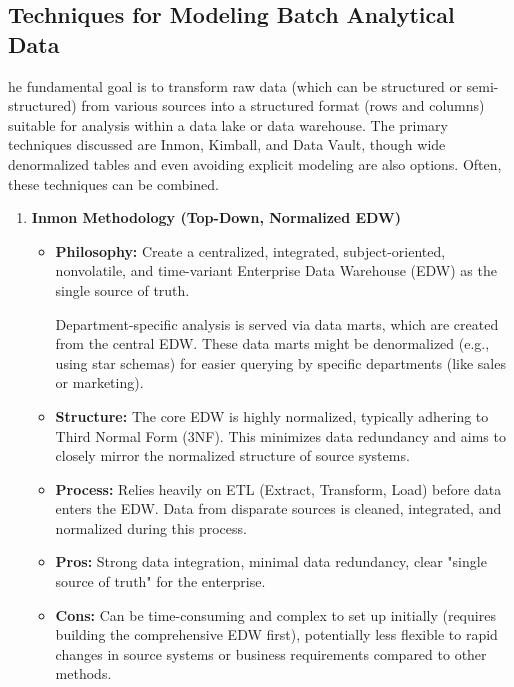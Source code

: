 \subsection*{Techniques for Modeling Batch Analytical Data}
he fundamental goal is to transform raw data (which can be structured or
semi-structured) from various sources into a structured format (rows and
columns) suitable for analysis within a data lake or data warehouse.
The primary techniques discussed are Inmon, Kimball, and Data Vault,
though wide denormalized tables and even avoiding explicit modeling are
also options. Often, these techniques can be combined.


\begin{enumerate}
    \item \textbf{Inmon Methodology (Top-Down, Normalized EDW)}
    
    \begin{itemize}
        \item \textbf{Philosophy:} Create a centralized, integrated,
        subject-oriented, nonvolatile, and time-variant Enterprise
        Data Warehouse (EDW) as the single source of truth.

        Department-specific analysis is served via data marts, which
        are created from the central EDW. These data marts might be
        denormalized (e.g., using star schemas) for easier querying
        by specific departments (like sales or marketing).

        \item \textbf{Structure:} The core EDW is highly normalized,
        typically adhering to Third Normal Form (3NF). This minimizes
        data redundancy and aims to closely mirror the normalized
        structure of source systems.

        \item \textbf{Process:} Relies heavily on ETL (Extract,
        Transform, Load) before data enters the EDW. Data from
        disparate sources is cleaned, integrated, and normalized
        during this process.

        \item \textbf{Pros:} Strong data integration, minimal data
        redundancy, clear "single source of truth" for the enterprise.

        \item \textbf{Cons:} Can be time-consuming and complex to
        set up initially (requires building the comprehensive EDW first),
        potentially less flexible to rapid changes in source systems or
        business requirements compared to other methods.
    \end{itemize}
    


\end{enumerate}
